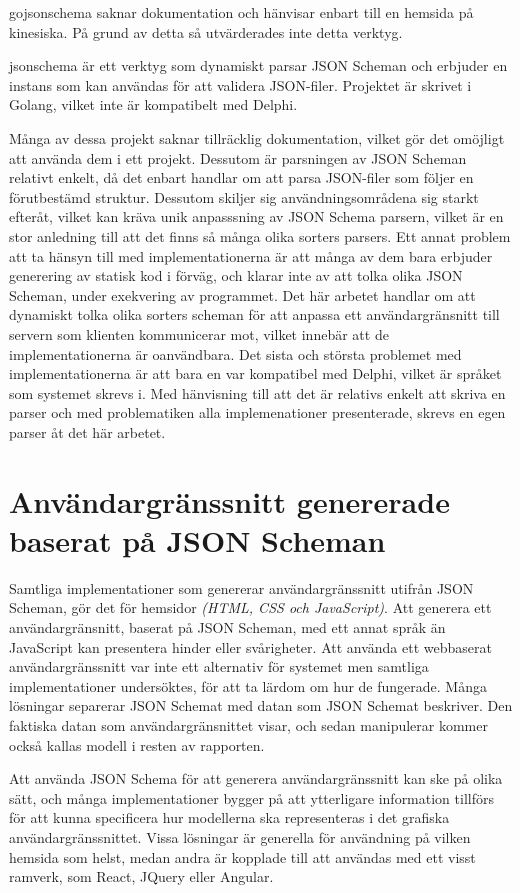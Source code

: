 gojsonschema saknar dokumentation och hänvisar enbart till en hemsida på kinesiska. På grund av detta så utvärderades inte detta verktyg. \cite{Zhangtao}

jsonschema är ett verktyg som dynamiskt parsar JSON Scheman och erbjuder en instans som kan användas för att validera JSON-filer. Projektet är skrivet i Golang, vilket inte är kompatibelt med Delphi. \cite{Qriinc.}

Många av dessa projekt saknar tillräcklig dokumentation, vilket gör det omöjligt att använda dem i ett projekt. Dessutom är parsningen av JSON Scheman relativt enkelt, då det enbart handlar om att parsa JSON-filer som följer en förutbestämd struktur. Dessutom skiljer sig användningsområdena sig starkt efteråt, vilket kan kräva unik anpasssning av JSON Schema parsern, vilket är en stor anledning till att det finns så många olika sorters parsers. Ett annat problem att ta hänsyn till med implementationerna är att många av dem bara erbjuder generering av statisk kod i förväg, och klarar inte av att tolka olika JSON Scheman, under exekvering av programmet. Det här arbetet handlar om att dynamiskt tolka olika sorters scheman för att anpassa ett användargränsnitt till servern som klienten kommunicerar mot, vilket innebär att de implementationerna är oanvändbara. Det sista och största problemet med implementationerna är att bara en var kompatibel med Delphi, vilket är språket som systemet skrevs i. Med hänvisning till att det är relativs enkelt att skriva en parser och med problematiken alla implemenationer presenterade, skrevs en egen parser åt det här arbetet.

\section{Användargränssnitt genererade baserat på JSON Scheman}
Samtliga implementationer som genererar användargränssnitt utifrån JSON Scheman, gör det för hemsidor \textit{(HTML, CSS och JavaScript)}. Att generera ett användargränsnitt, baserat på JSON Scheman, med ett annat språk än JavaScript kan presentera hinder eller svårigheter. Att använda ett webbaserat användargränssnitt var inte ett alternativ för systemet men samtliga implementationer undersöktes, för att ta lärdom om hur de fungerade. Många lösningar separerar JSON Schemat med datan som JSON Schemat beskriver. Den faktiska datan som användargränsnittet visar, och sedan manipulerar kommer också kallas modell i resten av rapporten.

Att använda JSON Schema för att generera användargränssnitt kan ske på olika sätt, och många implementationer bygger på att ytterligare information tillförs för att kunna specificera hur modellerna ska representeras i det grafiska användargränssnittet. Vissa lösningar är generella för användning på vilken hemsida som helst, medan andra är kopplade till att användas med ett visst ramverk, som React, JQuery eller Angular.

